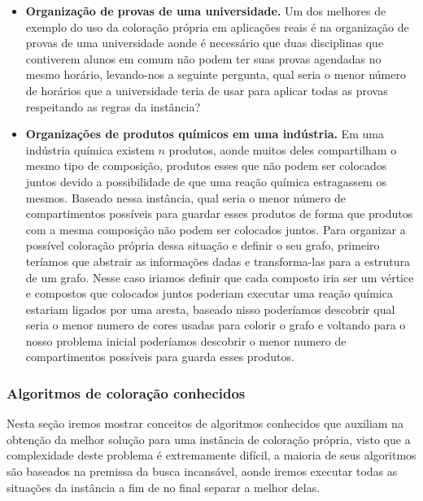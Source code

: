 \documentclass[12pt]{article}
\begin{document}
	
	\begin{itemize}
		
	
    \item \textbf{Organização de provas de uma universidade.}	Um dos melhores de exemplo do uso da coloração própria em aplicações reais é na organização de provas de uma universidade aonde é necessário que duas disciplinas que contiverem alunos em comum não podem ter suas provas agendadas no mesmo horário, levando-nos a seguinte pergunta, qual seria o menor número de horários que a universidade teria de usar para aplicar todas as provas respeitando as regras da instância?
	
    \item \textbf{Organizações de produtos químicos em uma indústria.} Em uma indústria química existem $n$ produtos, aonde muitos deles compartilham o mesmo tipo de composição, produtos esses que não podem ser colocados juntos devido a possibilidade de que uma reação química estragassem os mesmos. Baseado nessa instância, qual seria o menor número de compartimentos possíveis para guardar esses produtos de forma que produtos com a mesma composição não podem ser colocados juntos. Para organizar a possível coloração própria dessa situação e definir o seu grafo, primeiro teríamos que abstrair as informações dadas e transforma-las para a estrutura de um grafo. Nesse caso iriamos definir que cada composto iria ser um vértice e compostos que colocados juntos poderiam executar uma reação química estariam ligados por uma aresta, baseado nisso poderíamos descobrir qual seria o menor numero de cores usadas para colorir o grafo e voltando para o nosso problema inicial poderíamos descobrir o menor numero de compartimentos possíveis para guarda esses produtos.
   \end{itemize}
	\subsubsection{Algoritmos de coloração conhecidos}
	
	Nesta seção iremos mostrar conceitos de algoritmos conhecidos que auxiliam na obtenção da melhor solução para uma instância de coloração própria, visto que a complexidade deste problema é extremamente difícil, a maioria de seus algoritmos são baseados na premissa da busca incansável, aonde iremos executar todas as situações da instância a fim de no final separar a melhor delas.
	
\end{document}
